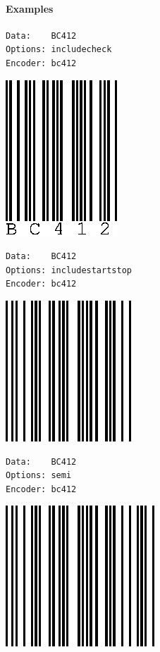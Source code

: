 \hypertarget{examples-38}{%
\paragraph{Examples}\label{examples-38}}

\begin{verbatim}
Data:    BC412
Options: includecheck
Encoder: bc412
\end{verbatim}

\includegraphics{images/bc412-1.eps}

\begin{verbatim}
Data:    BC412
Options: includestartstop
Encoder: bc412
\end{verbatim}

\includegraphics{images/bc412-2.eps}

\begin{verbatim}
Data:    BC412
Options: semi
Encoder: bc412
\end{verbatim}

\includegraphics{images/bc412-3.eps}

